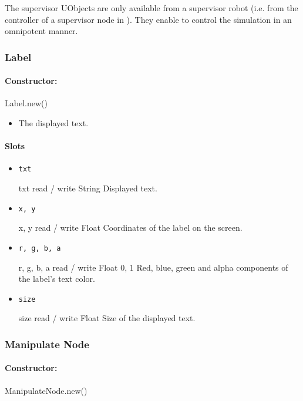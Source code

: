 The supervisor UObjects are only available from a supervisor robot
(i.e. from the controller of a supervisor node in \webots). They
enable to control the simulation in an omnipotent manner.

\subsubsection{Label}

\paragraph{Constructor:} Label.new()

\begin{itemize}
\item {} The displayed text.
\end{itemize}

\paragraph{Slots}

\begin{itemize}
\item \lstinline{txt}
\begin{attribute}{txt}
  {read / write}
  {String}
  {}
  Displayed text.
\end{attribute}
\item \lstinline{x, y}
\begin{attribute}{x, y}
  {read / write}
  {Float}
  {}
  Coordinates of the label on the screen.
\end{attribute}
\item \lstinline{r, g, b, a}
\begin{attribute}{r, g, b, a}
  {read / write}
  {Float}
  {0, 1}
  Red, blue, green and alpha components of the label's text color.
\end{attribute}
\item \lstinline{size}
\begin{attribute}{size}
  {read / write}
  {Float}
  {}
  Size of the displayed text.
\end{attribute}
\end{itemize}

\subsubsection{Manipulate Node}

\paragraph{Constructor:} ManipulateNode.new()

